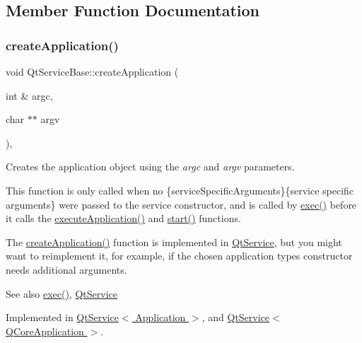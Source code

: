\subsection{Member Function Documentation}
\mbox{\label{class_qt_service_base_ac5ae73935f489282b35c70b27b341390}} 
\subsubsection{\texorpdfstring{create\+Application()}{createApplication()}}
{\footnotesize\ttfamily void Qt\+Service\+Base\+::create\+Application (\begin{DoxyParamCaption}\item[{int \&}]{argc,  }\item[{char $\ast$$\ast$}]{argv }\end{DoxyParamCaption})\hspace{0.3cm}{\ttfamily [protected]}, {}}

Creates the application object using the {\itshape argc} and {\itshape argv} parameters.

This function is only called when no  \{service\+Specific\+Arguments\}\{service specific arguments\} were passed to the service constructor, and is called by \hyperlink{class_qt_service_base_afae2e589de71c1ae3ae8db3dc9ab9c64}{exec()} before it calls the \hyperlink{class_qt_service_base_ab70633cd29a22758dfa0502b77e564f6}{execute\+Application()} and \hyperlink{class_qt_service_base_adbc0cd621b41bd3a6a1f62fda432e9e4}{start()} functions.

The \hyperlink{class_qt_service_base_ac5ae73935f489282b35c70b27b341390}{create\+Application()} function is implemented in \hyperlink{class_qt_service}{Qt\+Service}, but you might want to reimplement it, for example, if the chosen application type\textquotesingle{}s constructor needs additional arguments.

\begin{DoxySeeAlso}{See also}
\hyperlink{class_qt_service_base_afae2e589de71c1ae3ae8db3dc9ab9c64}{exec()}, \hyperlink{class_qt_service}{Qt\+Service} 
\end{DoxySeeAlso}


Implemented in \hyperlink{class_qt_service_a50aa2079345abfd0b1284be47e245b0b}{Qt\+Service$<$ Application $>$}, and \hyperlink{class_qt_service_a50aa2079345abfd0b1284be47e245b0b}{Qt\+Service$<$ Q\+Core\+Application $>$}.

